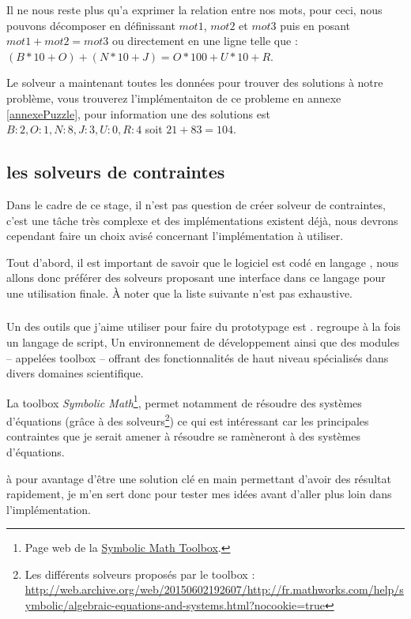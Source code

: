 Il ne nous reste plus qu'a exprimer la relation entre nos mots, pour ceci, nous pouvons décomposer en définissant $mot1$, $mot2$ et $mot3$ puis en posant $mot1+mot2=mot3$ ou directement en une ligne telle que : $(B*10 + O) +(N*10 +J) = O*100+U*10+R$.

Le solveur a maintenant toutes les données pour trouver des solutions à notre problème, vous trouverez l'implémentaiton de ce probleme en annexe \ref{annexePuzzle}, pour information une des solutions est ${B:2,O:1,N:8,J:3,U:0,R:4}$ soit $21+83=104$.




\subsection{les solveurs de contraintes}
Dans le cadre de ce stage, il n'est pas question de créer solveur de contraintes, c'est une tâche très complexe et des implémentations existent déjà, nous devrons cependant faire un choix avisé concernant l'implémentation à utiliser.

Tout d'abord, il est important de savoir que le logiciel \iscore{} est codé en langage \cpp{}, nous allons donc préférer des solveurs proposant une interface dans ce langage pour une utilisation finale. À noter que la liste suivante n'est pas exhaustive.%

\subsubsection{\matlab{}}
Un des outils que j'aime utiliser pour faire du prototypage est \matlab{}. \matlab{} regroupe à la fois un langage de script, Un environnement de développement ainsi que des modules -- appelées toolbox -- offrant des fonctionnalités de haut niveau spécialisés dans divers domaines scientifique.

La toolbox \emph{Symbolic Math}\footnote{Page web de la \href{http://fr.mathworks.com/products/symbolic/}{Symbolic Math Toolbox}.}, permet notamment de résoudre des systèmes d'équations (grâce à des solveurs\footnote{Les différents solveurs proposés par le toolbox : \url{http://web.archive.org/web/20150602192607/http://fr.mathworks.com/help/symbolic/algebraic-equations-and-systems.html?nocookie=true}}) ce qui est intéressant car les principales contraintes que je serait amener à résoudre se ramèneront à des systèmes d'équations.

\matlab{} à pour avantage d'être une solution clé en main permettant d'avoir des résultat rapidement, je m'en sert donc pour tester mes idées avant d'aller plus loin dans l'implémentation.

